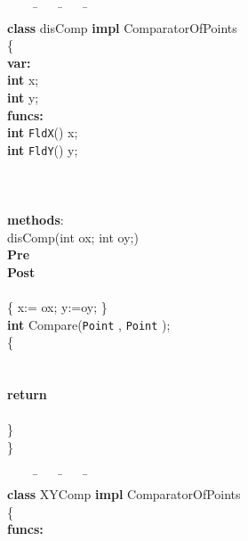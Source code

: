 \documentclass[fleqn]{llncs}
\begin{document}
\begin{figure}
\begin{center}
\begin{boxedminipage}{0.8\textwidth}
\scriptsize
\begin{tabbing}
\ \ \ \ \=\ \ \ \ \=\ \ \ \ \=\ \ \ \ \=\\
\textbf{class} disComp \textbf{impl} ComparatorOfPoints\\
\{\\
\textbf{var:}\\
    \>\textbf{int} x;\\
    \>\textbf{int} y;\\
\textbf{funcs:}\\
    \>\textbf{int} \texttt{FldX}() x;\\
    \>\textbf{int} \texttt{FldY}() y;\\
    \>\\
    \>  \>\\
    \>  \>\\
\textbf{methods}:\\
    \> disComp(int ox; int oy;)\\
    \>  \>\textbf{Pre} \>\>\\
    \>  \>\textbf{Post}\>\>\\
    \>  \>  \>  \>\\
    \>  \>\{ x:= ox; y:=oy; \}\\
    \>\textbf{int} Compare(\texttt{Point} , \texttt{Point} );\\
    \>\{\>\\
    \>  \>\\
    \>  \>\\
    \>  \>\textbf{return} \\
    \>  \>  \>  \>\ \ \\
    \>\}\\
\}
\end{tabbing}
\end{boxedminipage}
\begin{boxedminipage}{0.8\textwidth}
\scriptsize
\begin{tabbing}
\ \ \ \ \=\ \ \ \ \=\ \ \ \ \=\ \ \ \ \=\\
\textbf{class} XYComp \textbf{impl} ComparatorOfPoints\\
\{\\
\textbf{funcs:}\\
    \>\\
    \>  \>\\
    \>  \>\\
    \>  \>\\

\end{tabbing}
\end{boxedminipage}
\end{center}
\end{figure}
\end{document}
